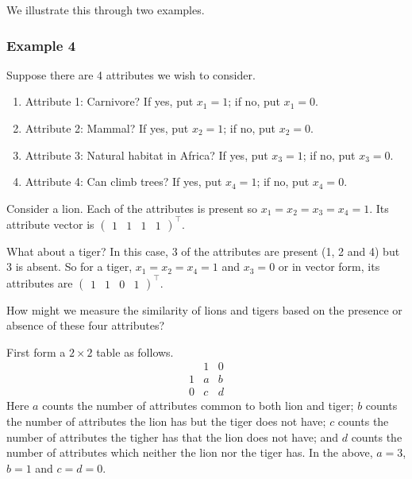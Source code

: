 \documentclass[]{book}
\providecommand{\tightlist}{%
  \setlength{\itemsep}{0pt}\setlength{\parskip}{0pt}}
\theoremstyle{definition}
\theoremstyle{definition}
\theoremstyle{definition}
\theoremstyle{remark}
\begin{document}
We illustrate this through two examples.

\hypertarget{example-4}{%
\subsubsection*{Example 4}\label{example-4}}

Suppose there are 4 attributes we wish to consider.

\begin{enumerate}
\def\labelenumi{\arabic{enumi}.}
\tightlist
\item
  Attribute 1: Carnivore? If yes, put \(x_1=1\); if no, put \(x_1=0\).
\item
  Attribute 2: Mammal? If yes, put \(x_2=1\); if no, put \(x_2=0\).
\item
  Attribute 3: Natural habitat in Africa? If yes, put \(x_3=1\); if no, put \(x_3=0\).
\item
  Attribute 4: Can climb trees? If yes, put \(x_4=1\); if no, put \(x_4=0\).
\end{enumerate}

Consider a lion. Each of the attributes is present so \(x_1=x_2=x_3=x_4=1\). Its attribute vector is \(\begin{pmatrix} 1&1&1&1\end{pmatrix}^\top\).

What about a tiger? In this case, 3 of the attributes are present (1, 2 and 4) but 3 is absent.
So for a tiger, \(x_1=x_2=x_4=1\) and \(x_3=0\) or in vector form, its attributes are \(\begin{pmatrix} 1&1&0&1\end{pmatrix}^\top\).

How might we measure the similarity of lions and tigers based on the presence or absence of these four attributes?

First form a \(2 \times 2\) table as follows.
\[
\begin{array}{cccc}
&1 &0\\
1& a & b\\
0& c & d
\end{array}
\]
Here \(a\) counts the number of attributes common to both lion and tiger; \(b\) counts the number of attributes the lion has but the tiger does not have; \(c\) counts the number of attributes the tigher has that the lion does not have; and \(d\) counts the number of attributes which neither the lion nor the tiger has.
In the above, \(a=3\), \(b=1\) and \(c=d=0\).
\end{document}
